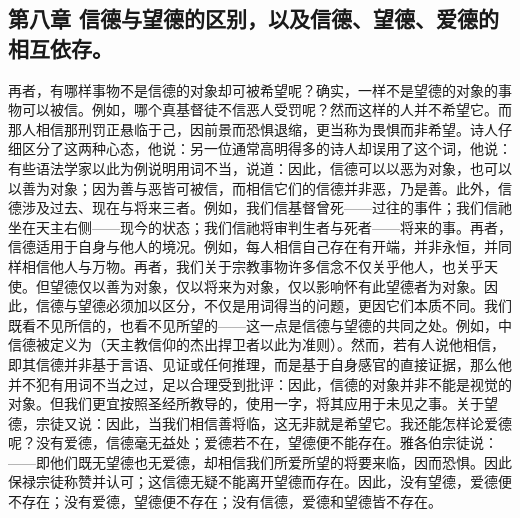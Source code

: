 
\subsection{第八章 信德与望德的区别，以及信德、望德、爱德的相互依存。}

再者，有哪样事物不是信德的对象却可被希望呢？确实，一样不是望德的对象的事物可以被信。例如，哪个真基督徒不信恶人受罚呢？然而这样的人并不希望它。而那人相信那刑罚正悬临于己，因前景而恐惧退缩，更当称为畏惧而非希望。诗人仔细区分了这两种心态，他说：另一位通常高明得多的诗人却误用了这个词，他说：有些语法学家以此为例说明用词不当，说道：因此，信德可以以恶为对象，也可以以善为对象；因为善与恶皆可被信，而相信它们的信德并非恶，乃是善。此外，信德涉及过去、现在与将来三者。例如，我们信基督曾死——过往的事件；我们信祂坐在天主右侧——现今的状态；我们信祂将审判生者与死者——将来的事。再者，信德适用于自身与他人的境况。例如，每人相信自己存在有开端，并非永恒，并同样相信他人与万物。再者，我们关于宗教事物许多信念不仅关乎他人，也关乎天使。但望德仅以善为对象，仅以将来为对象，仅以影响怀有此望德者为对象。因此，信德与望德必须加以区分，不仅是用词得当的问题，更因它们本质不同。我们既看不见所信的，也看不见所望的——这一点是信德与望德的共同之处。例如，中信德被定义为（天主教信仰的杰出捍卫者以此为准则）。然而，若有人说他相信，即其信德并非基于言语、见证或任何推理，而是基于自身感官的直接证据，那么他并不犯有用词不当之过，足以合理受到批评：因此，信德的对象并非不能是视觉的对象。但我们更宜按照圣经所教导的，使用一字，将其应用于未见之事。关于望德，宗徒又说：因此，当我们相信善将临，这无非就是希望它。我还能怎样论爱德呢？没有爱德，信德毫无益处；爱德若不在，望德便不能存在。雅各伯宗徒说：——即他们既无望德也无爱德，却相信我们所爱所望的将要来临，因而恐惧。因此保禄宗徒称赞并认可；这信德无疑不能离开望德而存在。因此，没有望德，爱德便不存在；没有爱德，望德便不存在；没有信德，爱德和望德皆不存在。\par



